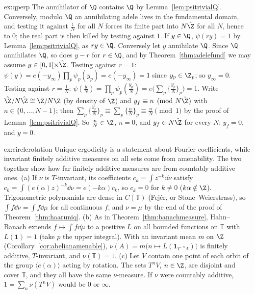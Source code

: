 \begin{solution}{ex:qperp}
\idea The annihilator of $\Q$ contains $\Q$ by Lemma~\ref{lem:psitrivialQ}. Conversely, modulo $\Q$ an annihilating adele lives in the fundamental domain, and
testing it against $\frac1N$ for all $N$ forces its finite part into $N\hat{\Z}$ for all $N$, hence to $0$; the real part is then killed by testing against $1$.
\writeup If $y\in\Q$, $\psi(ry)=1$ by Lemma~\ref{lem:psitrivialQ}, as $ry\in\Q$. Conversely let $y$ annihilate $\Q$. Since $\Q$ annihilates $\Q$, so does $y-r$ for $r\in\Q$, and by
Theorem~\ref{thm:adelefund} we may assume $y\in[0,1[\times\hat{\Z}$. Testing against $r=1$: $\psi(y)=e(-y_\infty)\prod_p\psi_p(y_p)=e(-y_\infty)=1$ since $y_p\in\Z_p$; so $y_\infty=0$. Testing
against $r=\frac1N$: $\psi(\frac yN)=\prod_p\psi_p(\frac{y_p}N)=e\bigl(\sum_p\{\frac{y_p}N\}_p\bigr)=1$. Write $\hat{\Z}/N\hat{\Z}\cong\Z/N\Z$ (by density of $\Z$) and $y_f\equiv n\pmod{N\hat{\Z}}$ with
$n\in\{0,\dots,N-1\}$; then $\sum_p\{\frac{y_p}N\}_p\equiv\sum_p\{\frac nN\}_p\equiv\frac nN\pmod1$ by the proof of Lemma~\ref{lem:psitrivialQ}. So $\frac nN\in\Z$, $n=0$, and $y_f\in N\hat{\Z}$
for every $N$: $y_f=0$, and $y=0$.
\end{solution}

\begin{solution}{ex:circlerotation}
\idea Unique ergodicity is a statement about Fourier coefficients, while invariant finitely additive measures on all sets come from amenability. The two
together show how far finitely additive measures are from countably additive ones.
\writeup (a) If $\nu$ is $T$-invariant, its coefficients $c_k=\int z^{-k}\dd\nu$ satisfy $c_k=\int(e(\alpha)z)^{-k}\dd\nu=e(-k\alpha)c_k$, so $c_k=0$ for $k\ne0$ ($k\alpha\notin\Z$). Trigonometric
polynomials are dense in $C(\mathbb T)$ (Fej\'er, or Stone--Weierstrass), so $\int f\dd\nu=\int f\dd\mu$ for all continuous $f$, and $\nu=\mu$ by the end of the proof of
Theorem~\ref{thm:haaruniq}. (b) As in Theorem~\ref{thm:banachmeasure}, Hahn--Banach extends $f\mapsto\int f\dd\mu$ to a positive $L$ on all bounded functions on $\mathbb T$ with $L(\mathbf 1)=1$
(take $p$ the upper integral). With an invariant mean $m$ on $\Z$ (Corollary~\ref{cor:abelianamenable}), $\nu(A)=m\bigl(n\mapsto L(\mathbf 1_{T^{-n}A})\bigr)$ is finitely additive, $T$-invariant,
and $\nu(\mathbb T)=1$. (c) Let $V$ contain one point of each orbit of the group $\langle e(\alpha)\rangle$ acting by rotation. The sets $T^nV$, $n\in\Z$, are disjoint and cover
$\mathbb T$, and they all have the same $\nu$-measure. If $\nu$ were countably additive, $1=\sum_n\nu(T^nV)$ would be $0$ or $\infty$.
\end{solution}

